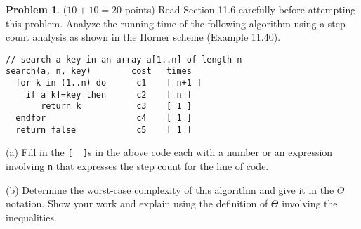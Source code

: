 \documentclass{article}
\theoremstyle{definition}
\newtheorem{problem}{Problem}
\begin{document}
\newpage
\begin{problem} ($10+10=20$ points) Read Section 11.6 carefully before attempting this problem.
Analyze the running time of the following algorithm using a step count analysis 
as shown in the Horner scheme (Example 11.40).  
\begin{verbatim}
// search a key in an array a[1..n] of length n
search(a, n, key)        cost   times
  for k in (1..n) do      c1    [ n+1 ]   
    if a[k]=key then      c2    [ n ]
       return k           c3    [ 1 ]
  endfor                  c4    [ 1 ]
  return false            c5    [ 1 ]
\end{verbatim}
(a) Fill in the \verb|[  ]|s in the above code each with a number or an expression involving
\verb|n| that expresses the step count for the line of code.

\medskip
\noindent
(b) Determine the worst-case complexity of this algorithm and give it in the $\Theta$ notation.
Show your work and explain using the definition of $\Theta$ involving the inequalities. 
\end{problem}
\end{document}
